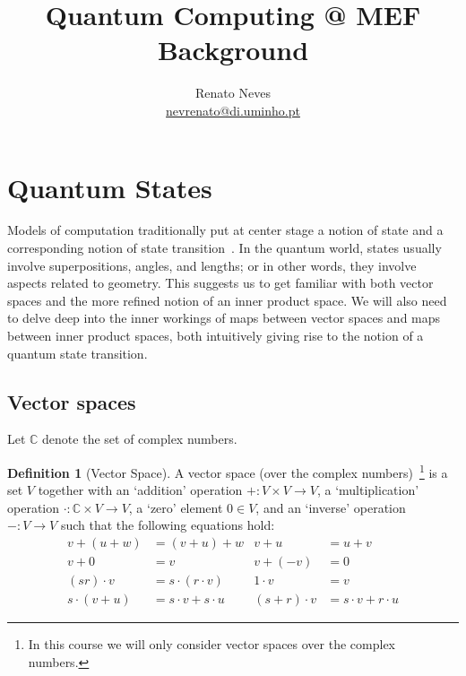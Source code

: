 \documentclass[a4paper, 11pt]{article}
\date{}
\newcommand{\complex}{\mathbb{C}}
\theoremstyle{definition}
\newtheorem{definition}{Definition}
\begin{document}
\title{Quantum Computing @ MEF \\ \large Background}
\author{Renato Neves \\ \scriptsize
  \href{mailto:nevrenato@di.uminho.pt}{nevrenato@di.uminho.pt}}
\maketitle

\section{Quantum States}

Models of computation traditionally put at center stage a notion of
state and a corresponding notion of state
transition~\cite{bruni17}. In the quantum world, states usually
involve superpositions, angles, and lengths; or in other words, they
involve aspects related to geometry. This suggests us to get familiar
with both vector spaces and the more refined notion of an inner
product space. We will also need to delve deep into the inner workings
of maps between vector spaces and maps between inner product spaces,
both intuitively giving rise to the notion of a quantum state
transition.

\subsection{Vector spaces}

Let $\complex$ denote the set of complex numbers.

\begin{definition}[Vector Space]
  A vector space (over the complex numbers)~\footnote{In this course we will
    only consider vector spaces over the complex numbers.} is a set
  $V$ together with an `addition' operation $+ : V \times V \to V$, a
  `multiplication' operation $\cdot : \complex \times V \to V$, a
  `zero' element $0 \in V$, and an `inverse' operation $- : V \to V$
  such that the following equations hold:
  \begin{align*}
    v + (u + w) & = (v + u) + w & v + u & = u + v  \\
    v + 0 & = v & v + (-v) & = 0 \\
    (s r) \cdot v & = s \cdot (r \cdot v) & 1 \cdot v & = v  \\
    s \cdot (v + u) & = s \cdot v + s \cdot u & (s + r) \cdot v & = s \cdot v + r \cdot u
  \end{align*}
\end{definition}
\end{document}

